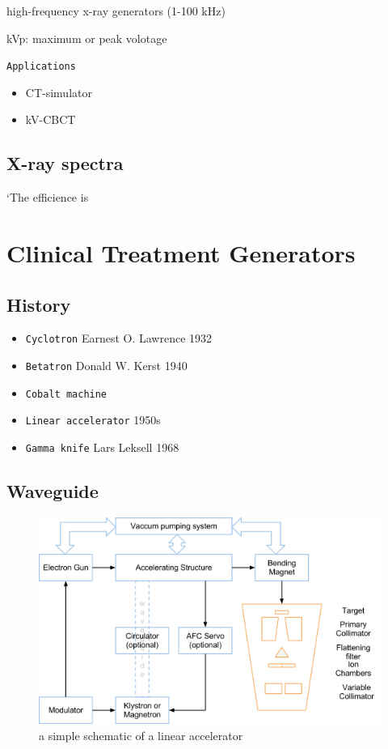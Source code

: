 \documentclass[]{book}
\providecommand{\tightlist}{%
  \setlength{\itemsep}{0pt}\setlength{\parskip}{0pt}}
\theoremstyle{definition}
\theoremstyle{definition}
\theoremstyle{definition}
\theoremstyle{remark}
\begin{document}
high-frequency x-ray generators (1-100 kHz)

kVp: maximum or peak volotage

\texttt{Applications}

\begin{itemize}
\tightlist
\item
  CT-simulator
\item
  kV-CBCT
\end{itemize}

\section{X-ray spectra}\label{x-ray-spectra}

`The efficience is

\chapter{Clinical Treatment Generators}\label{gene}

\section{History}\label{history-1}

\begin{itemize}
\tightlist
\item
  \texttt{Cyclotron} Earnest O. Lawrence 1932
\item
  \texttt{Betatron} Donald W. Kerst 1940
\item
  \texttt{Cobalt\ machine}
\item
  \texttt{Linear\ accelerator} 1950s
\item
  \texttt{Gamma\ knife} Lars Leksell 1968
\end{itemize}

\section{Waveguide}\label{waveguide}

\begin{figure}

{\centering \includegraphics{figures/components} 

}

\caption{a simple schematic of a linear accelerator}\label{fig:unnamed-chunk-3}
\end{figure}
\end{document}
